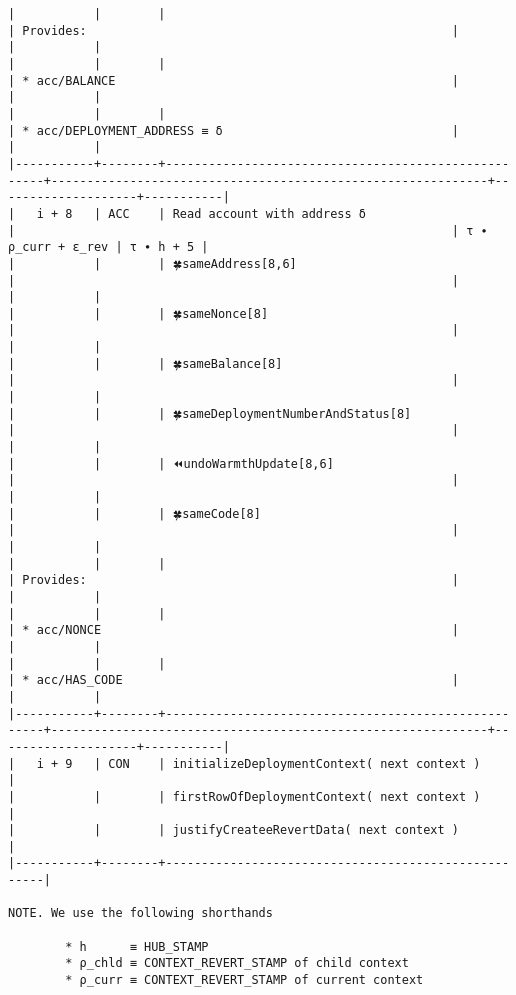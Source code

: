 \documentclass[varwidth=\maxdimen,margin=0.5cm,multi={verbatim}]{standalone}
\begin{document}
\begin{verbatim}
|           |        |                                                     | Provides:                                                   |                    |           |
|           |        |                                                     | * acc/BALANCE                                               |                    |           |
|           |        |                                                     | * acc/DEPLOYMENT_ADDRESS ≡ δ                                |                    |           |
|-----------+--------+-----------------------------------------------------+-------------------------------------------------------------+--------------------+-----------|
|   i + 8   | ACC    | Read account with address δ                         |                                                             | τ ∙ ρ_curr + ε_rev | τ ∙ h + 5 |
|           |        | 🍀sameAddress[8,6]                                  |                                                             |                    |           |
|           |        | 🍀sameNonce[8]                                      |                                                             |                    |           |
|           |        | 🍀sameBalance[8]                                    |                                                             |                    |           |
|           |        | 🍀sameDeploymentNumberAndStatus[8]                  |                                                             |                    |           |
|           |        | ⏪undoWarmthUpdate[8,6]                             |                                                             |                    |           |
|           |        | 🍀sameCode[8]                                       |                                                             |                    |           |
|           |        |                                                     | Provides:                                                   |                    |           |
|           |        |                                                     | * acc/NONCE                                                 |                    |           |
|           |        |                                                     | * acc/HAS_CODE                                              |                    |           |
|-----------+--------+-----------------------------------------------------+-------------------------------------------------------------+--------------------+-----------|
|   i + 9   | CON    | initializeDeploymentContext( next context )         |
|           |        | firstRowOfDeploymentContext( next context )         |
|           |        | justifyCreateeRevertData( next context )            |
|-----------+--------+-----------------------------------------------------|

NOTE. We use the following shorthands

        * h      ≡ HUB_STAMP
        * ρ_chld ≡ CONTEXT_REVERT_STAMP of child context
        * ρ_curr ≡ CONTEXT_REVERT_STAMP of current context

\end{verbatim}
\end{document}
